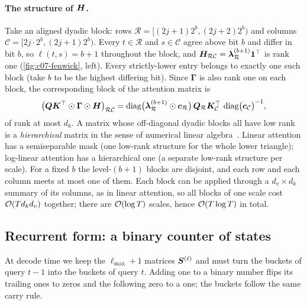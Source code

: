 \paragraph{The structure of $\bm{H}$.}
Take an aligned dyadic block: rows $\mathcal{R} = [(2j+1)2^b, (2j+2)2^b)$ and columns
$\mathcal{C} = [2j\cdot 2^b, (2j+1)2^b)$. Every $t \in \mathcal{R}$ and $s\in \mathcal{C}$
agree above bit $b$ and differ in bit $b$, so $\ell(t,s) = b+1$ throughout the block, and
$\bm{H}_{\mathcal{R}\mathcal{C}} = \bm{\lambda}^{(b+1)}_{\mathcal{R}}\bm{1}^{\top}$ is rank one
(\cref{fig:c07-fenwick}, left). Every strictly-lower entry belongs to exactly one such block
(take $b$ to be the highest differing bit). Since $\bm{\Gamma}$ is also rank one on each block,
the corresponding block of the attention matrix is
\[
  \bigl(\bm{Q}\bm{K}^{\top}\odot\bm{\Gamma}\odot\bm{H}\bigr)_{\mathcal{R}\mathcal{C}}
  = \operatorname{diag}\bigl(\bm{\lambda}^{(b+1)}_{\mathcal{R}} \odot \bm{c}_{\mathcal{R}}\bigr)\,
    \bm{Q}_{\mathcal{R}}\bm{K}_{\mathcal{C}}^{\top}\,
    \operatorname{diag}\bigl(\bm{c}_{\mathcal{C}}\bigr)^{-1},
\]
of rank at most $d_k$. A matrix whose off-diagonal dyadic blocks all have low rank is a
\emph{hierarchical} matrix in the sense of numerical linear
algebra~\citep{c07-hackbusch1999hmatrix}. Linear attention has a semiseparable mask (one
low-rank structure for the whole lower triangle); log-linear attention has a hierarchical
one (a separate low-rank structure per scale). For a fixed $b$ the level-$(b+1)$ blocks are
disjoint, and each row and each column meets at most one of them. Each block can be applied
through a $d_v\times d_k$ summary of its columns, as in linear attention, so all blocks of
one scale cost $\mathcal{O}(T d_k d_v)$ together; there are $\mathcal{O}(\log T)$ scales, hence
$\mathcal{O}(T\log T)$ in total.

\subsection{Recurrent form: a binary counter of states}\label{sec:c07-ll-recurrent}

At decode time we keep the $\ell_{\max}+1$ matrices $\bm{S}^{(\ell)}$ and must turn the buckets
of query $t-1$ into the buckets of query $t$. Adding one to a binary number flips its
trailing ones to zeros and the following zero to a one; the buckets follow the same carry
rule.

